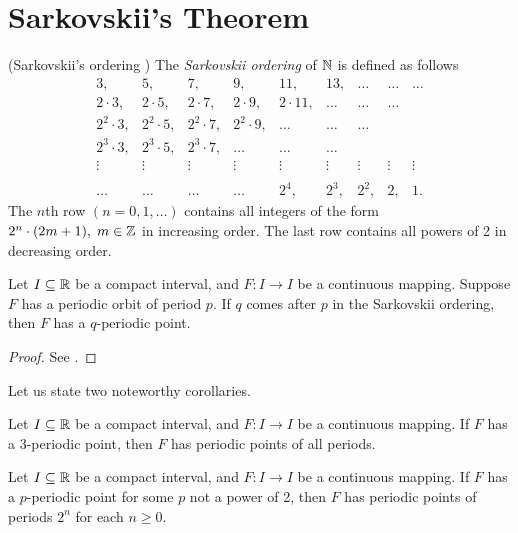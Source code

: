 \documentclass[10pt,twoside]{book}
\begin{document}
\chapter{Sarkovskii's Theorem}
\label{appendix:sarkovskii}
\begin{theorem}
  (Sarkovskii's ordering \citep{sarkovskii})
  The \textit{Sarkovskii ordering} of $\mathbb{N}$ is defined as follows
  \[
    \begin{array}{ccccccccc}
    3, & 5, & 7, & 9, & 11, & 13, & \ldots & \ldots & \ldots\\
    2\cdot 3, & 2\cdot 5, & 2\cdot 7, & 2\cdot 9, & 2\cdot 11, & \ldots & \ldots & \ldots\\
    2^2\cdot 3, & 2^2\cdot 5, & 2^2\cdot 7, & 2^2\cdot 9, & \ldots & \ldots & \ldots\\
    2^3\cdot 3, & 2^3\cdot 5, & 2^3\cdot 7, & \ldots & \ldots & \ldots\\
    \vdots & \vdots & \vdots & \vdots & \vdots & \vdots & \vdots & \vdots  & \vdots \\
    \\
    \ldots & \ldots & \ldots & \ldots & 2^4, & 2^3, & 2^2, & 2, & 1.
  \end{array}
  \]
  The $n$th row $(n = 0, 1, \ldots)$ contains all integers of the form $2^n\cdot (2m + 1),\; m \in \mathbb{Z}$ in increasing order.
  The last row contains all powers of 2 in decreasing order.

  Let $I \subseteq \mathbb{R}$ be a compact interval, and $F: I\to I$ be a continuous mapping.
  Suppose $F$ has a periodic orbit of period $p$.
  If $q$ comes after $p$ in the Sarkovskii ordering, then $F$ has a $q$-periodic point.
  \label{thm:sarkovskii}
  \begin{proof}
    See \citep{blockcoppel}.
  \end{proof}
\end{theorem}
Let us state two noteworthy corollaries.
\begin{corollary}
  Let $I \subseteq \mathbb{R}$ be a compact interval, and $F: I\to I$ be a continuous mapping.
  If $F$ has a 3-periodic point, then $F$ has periodic points of all periods.
\end{corollary}
\begin{corollary}
  Let $I \subseteq \mathbb{R}$ be a compact interval, and $F: I\to I$ be a continuous mapping.
  If $F$ has a $p$-periodic point for some $p$ not a power of 2, then $F$ has periodic points of periods $2^n$ for each $n \geq 0$.
\end{corollary}
 



\printindex
\end{document}
